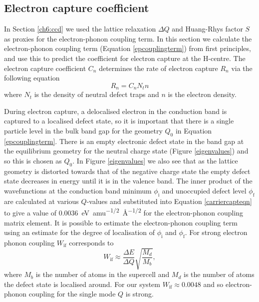 \subsection{Electron capture coefficient} \label{finalsection}

In Section \ref{ch6:ccd} we used the lattice relaxation $\Delta Q$ and Huang-Rhys factor $S$ as proxies for the electron-phonon coupling term. In this section we calculate the electron-phonon coupling term (Equation \ref{epcouplingterm}) from first principles, and use this to predict the coefficient for electron capture at the H-centre. The electron capture coefficient $C_n$ determines the rate of electron capture $R_n$ via the following equation
\begin{equation} \label{rateeqn}
R_n=C_nN_tn
\end{equation}
where $N_t$ is the density of neutral defect traps and $n$ is the electron density.

During electron capture, a delocalised electron in the conduction band is captured to a localised defect state, so it is important that there is a single particle level in the bulk band gap for the geometry $Q_0$ in Equation \ref{epcouplingterm}.\autocite{Alkauskas2014} There is an empty electronic defect state in the band gap at the equilibrium geometry for the neutral charge state (Figure \ref{eigenvalues}) and so this is chosen as $Q_0$.
In Figure \ref{eigenvalues} we also see that as the lattice geometry is distorted towards that of the negative charge state the empty defect state decreases in energy until it is in the valence band. 
The inner product of the wavefunctions at the conduction band minimum $\phi_\textrm{i}$ and unoccupied defect level $\phi_\textrm{f}$ are calculated at various $Q$-values and substituted into Equation \ref{carriercapteqn} to give a value of \SI{0.0036}{\electronvolt amu\tothe{-1/2}\angstrom\tothe{-1/2}} for the electron-phonon coupling matrix element.
It is possible to estimate the electron-phonon coupling term using an estimate for the degree of localisation of $\phi_\textrm{i}$ and $\phi_\textrm{f}$. For strong electron phonon coupling $W_\textrm{if}$ corresponds to\autocite{Alkauskas2014} 
\begin{equation}
W_\textrm{if} \approx \frac{\Delta E}{\Delta Q}\sqrt{\frac{M_d}{M_b}},
\end{equation}
where $M_b$ is the number of atoms in the supercell and $M_d$ is the number of atoms the defect state is localised around. For our system $W_\textrm{if}\approx0.0048$ and so electron-phonon coupling for the single mode $Q$ is strong.

